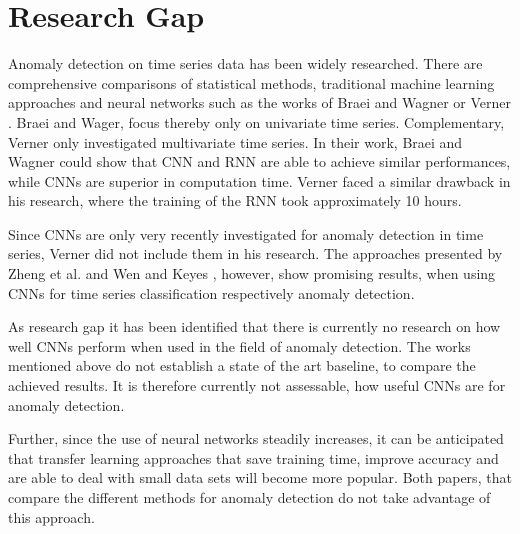\section{Research Gap}
Anomaly detection on time series data has been widely researched. There are comprehensive comparisons of statistical methods, traditional machine learning approaches and neural networks such as the works of Braei and Wagner \parencite*{Braei2020} or Verner \parencite*{Verner2019}. Braei and Wager, focus thereby only on univariate time  series. Complementary, Verner only investigated multivariate time series. In their work, Braei and Wagner could show that CNN and RNN are able to achieve similar performances, while CNNs are superior in computation time. Verner faced a similar drawback in his research, where the training of the RNN took approximately 10 hours. 

Since CNNs are only very recently investigated for anomaly detection in time series, Verner did not include them in his research. The approaches presented by Zheng et al. \parencite*{Zheng2014} and Wen and Keyes \parencite*{Wen2019}, however, show promising results, when using CNNs for time series classification respectively anomaly detection. 

As research gap it has been identified that there is currently no research on how well CNNs perform when used in the field of anomaly detection. The works mentioned above do not establish a state of the art baseline, to compare the achieved results. It is therefore currently not assessable, how useful CNNs are for anomaly detection.

Further, since the use of neural networks steadily increases, it can be anticipated that transfer learning approaches that save training time, improve accuracy and are able to deal with small data sets will become more popular. Both papers, that compare the different methods for anomaly detection do not take advantage of this approach.

